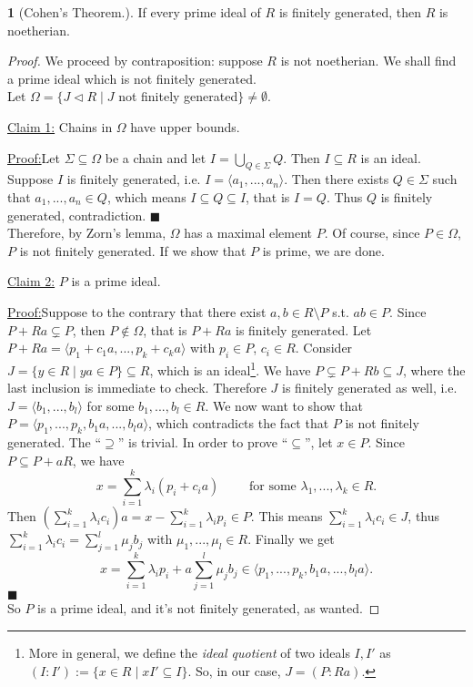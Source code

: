 \documentclass[12pt,a4paper]{report}
\theoremstyle{definition}
\theoremstyle{num.custom-title}
\newtheorem{teo_custom-title}[theorem]{} %
\newenvironment{claim}[1]{\par\noindent\underline{Claim#1:}\space}{} %
\newenvironment{claimproof}[1]{\par\noindent\underline{Proof:}\space#1}{\leavevmode\unskip\penalty9999 \hbox{}\nobreak\hfill\quad\hbox{$\blacksquare$}} %
\DeclareMathOperator{\sm}{\setminus}
\DeclareMathOperator{\sse}{\subseteq}
\begin{document}
\begin{teo_custom-title}[Cohen's Theorem.]
If every prime ideal of $R$ is finitely generated, then $R$ is noetherian.
\begin{proof}
We proceed by contraposition: suppose $R$ is not noetherian. We shall find a prime ideal which is not finitely generated.\\
Let $\Omega=\{J \lhd R \mid J$ not finitely generated$\} \neq \emptyset$.
\begin{claim}{ 1}
Chains in $\Omega$ have upper bounds.
\begin{claimproof}
Let $\Sigma \sse \Omega$ be a chain and let $I=\bigcup_{Q \in \Sigma} Q$. Then $I \sse R$ is an ideal. Suppose $I$ is finitely generated, i.e. $I= \langle a_1,...,a_n \rangle$. Then there exists $Q \in \Sigma$ such that $a_1,...,a_n \in Q$, which means $I \sse Q \sse I$, that is $I=Q$. Thus $Q$ is finitely generated, contradiction.
\end{claimproof}
\end{claim}\\
Therefore, by Zorn's lemma, $\Omega$ has a maximal element $P$. Of course, since $P \in \Omega$, $P$ is not finitely generated. If we show that $P$ is prime, we are done.
\begin{claim}{ 2}
$P$ is a prime ideal.
\begin{claimproof}
Suppose to the contrary that there exist $a,b \in R \sm P$ s.t. $ab \in P$. Since $P+Ra \subsetneq P$, then $P \not\in \Omega$, that is $P+Ra$ is finitely generated. Let $P+Ra= \langle p_1+c_1 a,...,p_k+c_k a \rangle$ with $p_i \in P$, $c_i \in R$. Consider $J=\{y \in R \mid ya \in P\} \sse R$, which is an ideal\footnote{More in general, we define the \emph{ideal quotient} of two ideals $I,I'$ as $(I:I'):=\{x \in R \mid xI' \sse I\}$. So, in our case, $J=(P:Ra)$.}. We have $P \subsetneq P+Rb \sse J$, where the last inclusion is immediate to check. Therefore $J$ is finitely generated as well, i.e. $J=\langle b_1,...,b_l \rangle$ for some $b_1,...,b_l \in R$. We now want to show that $P=\langle p_1,...,p_k,b_1a,...,b_la \rangle$, which contradicts the fact that $P$ is not finitely generated. The ``$\supseteq$'' is trivial. In order to prove ``$\sse$'', let $x \in P$. Since $P \sse P+aR$, we have
\[
x=\sum_{i=1}^k \lambda_i(p_i+c_i a) \qquad \text{ for some } \lambda_1,...,\lambda_k \in R.
\]
Then $\left( \sum_{i=1}^k \lambda_i c_i \right) a = x - \sum_{i=1}^k \lambda_i p_i \in P$. This means $\sum_{i=1}^k \lambda_i c_i \in J$, thus $\sum_{i=1}^k \lambda_i c_i = \sum_{j=1}^l \mu_j b_j$ with $\mu_1,...,\mu_l \in R$. Finally we get
\[
x= \sum_{i=1}^k \lambda_i p_i + a \sum_{j=1}^l \mu_j b_j \in \langle p_1,...,p_k,b_1a,...,b_la \rangle.
\]
\end{claimproof}
\end{claim}\\
So $P$ is a prime ideal, and it's not finitely generated, as wanted.
\end{proof}
\end{teo_custom-title}
\end{document}
